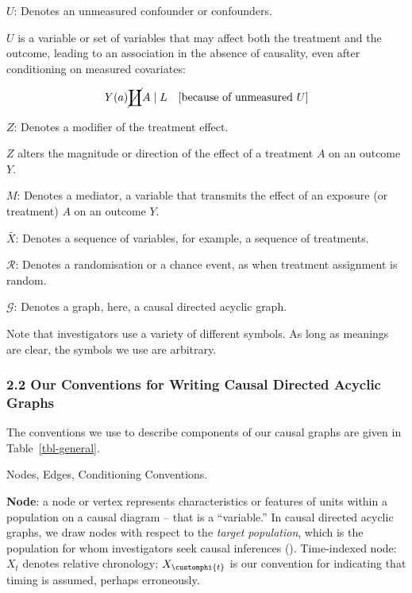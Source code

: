 \documentclass[
  single column]{article}
\begin{document}
\textbf{\(U\)}: Denotes an unmeasured confounder or confounders.

\(U\) is a variable or set of variables that may affect both the
treatment and the outcome, leading to an association in the absence of
causality, even after conditioning on measured covariates:

\[
Y(a) \cancel{\coprod} A \mid L \quad \text{[because of unmeasured } U]
\]

\textbf{\(Z\)}: Denotes a modifier of the treatment effect.

\(Z\) alters the magnitude or direction of the effect of a treatment
\(A\) on an outcome \(Y\).

\textbf{\(M\)}: Denotes a mediator, a variable that transmits the effect
of an exposure (or treatment) \(A\) on an outcome \(Y\).

\textbf{\(\bar{X}\)}: Denotes a sequence of variables, for example, a
sequence of treatments.

\textbf{\(\mathcal{R}\)}: Denotes a randomisation or a chance event, as
when treatment assignment is random.

\textbf{\(\mathcal{G}\)}: Denotes a graph, here, a causal directed
acyclic graph.

Note that investigators use a variety of different symbols. As long as
meanings are clear, the symbols we use are arbitrary.

\subsubsection{2.2 Our Conventions for Writing Causal Directed Acyclic
Graphs}\label{our-conventions-for-writing-causal-directed-acyclic-graphs}

The conventions we use to describe components of our causal graphs are
given in Table~\ref{tbl-general}.

\begin{table}

\caption{\label{tbl-general}Nodes, Edges, Conditioning Conventions.}

\centering{

\terminologygeneraldags

}

\end{table}%

\textbf{Node}: a node or vertex represents characteristics or features
of units within a population on a causal diagram -- that is a
``variable.'' In causal directed acyclic graphs, we draw nodes with
respect to the \emph{target population}, which is the population for
whom investigators seek causal inferences
(). Time-indexed
node: \(X_t\) denotes relative chronology; \(X_{\customphi{t}}\) is our
convention for indicating that timing is assumed, perhaps erroneously.
\end{document}
